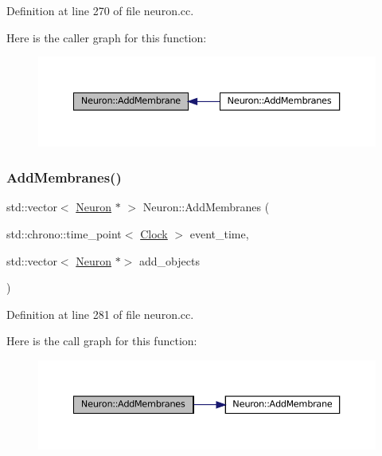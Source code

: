 Definition at line 270 of file neuron.\+cc.

Here is the caller graph for this function\+:\nopagebreak
\begin{figure}[H]
\begin{center}
\leavevmode
\includegraphics[width=350pt]{class_neuron_a99d4b64f128e2bfbffec3c5d476a2ca3_icgraph}
\end{center}
\end{figure}
\mbox{\label{class_neuron_a9e1f79bf8e991893f4ef318841932a13}} 
\subsubsection{\texorpdfstring{Add\+Membranes()}{AddMembranes()}}
{\footnotesize\ttfamily std\+::vector$<$ \mbox{\hyperlink{class_neuron}{Neuron}} $\ast$ $>$ Neuron\+::\+Add\+Membranes (\begin{DoxyParamCaption}\item[{std\+::chrono\+::time\+\_\+point$<$ \mbox{\hyperlink{universe_8h_a0ef8d951d1ca5ab3cfaf7ab4c7a6fd80}{Clock}} $>$}]{event\+\_\+time,  }\item[{std\+::vector$<$ \mbox{\hyperlink{class_neuron}{Neuron}} $\ast$$>$}]{add\+\_\+objects }\end{DoxyParamCaption})}



Definition at line 281 of file neuron.\+cc.

Here is the call graph for this function\+:\nopagebreak
\begin{figure}[H]
\begin{center}
\leavevmode
\includegraphics[width=350pt]{class_neuron_a9e1f79bf8e991893f4ef318841932a13_cgraph}
\end{center}
\end{figure}
\mbox{\label{class_neuron_a6198fa352056e3bbe1e979adf088b900}} 
